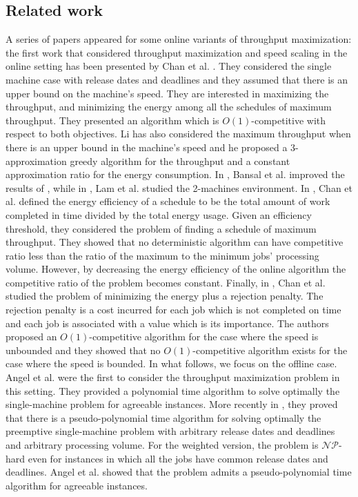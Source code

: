 \documentclass[11pt,a4paper]{article}
\begin{document}
\subsection{Related work}
A series of papers appeared for some online variants of throughput maximization: the first work that considered throughput maximization and speed scaling in the online setting  has been presented by Chan et al.
\cite{CCLLMW07}. They considered the single machine case with release dates and deadlines and they assumed that there is an upper bound on the machine's speed.
They are interested in maximizing the throughput, and minimizing the energy among
all the schedules of maximum throughput.
They presented an algorithm which is $O(1)$-competitive with respect to both objectives.
Li \cite{Li11} has also considered the maximum throughput when
there is an upper bound in the machine's speed and he proposed
a 3-approximation greedy algorithm for the throughput and a 
constant approximation ratio for the energy consumption.
In \cite{BCLL08}, Bansal et al. improved the results of \cite{CCLLMW07}, while in \cite{LLTW07}, Lam et al. studied the 2-machines
environment.
In \cite{CLMW07}, Chan et al.  defined the energy efficiency of a schedule 
to be the total amount of work completed in time divided by the total energy usage.
Given an efficiency threshold, they considered the problem of finding a schedule of maximum throughput.
They showed that no deterministic algorithm can have competitive ratio less than the ratio of the maximum to 
the minimum jobs' processing volume.
However, by decreasing the energy efficiency of the online algorithm the competitive ratio
of the problem becomes constant.
 Finally,
in \cite{CLL10}, Chan et al. studied the problem of minimizing the energy plus a rejection penalty. The rejection penalty is a cost incurred for each job which is not completed on time and each job is associated with a value which is its importance. The authors proposed an $O(1)$-competitive algorithm for the case where the speed is unbounded and they showed that no $O(1)$-competitive algorithm exists for the case where the speed is bounded.
In what follows, we focus on the offline case.
Angel et al. \cite{ABCL13} were the first to consider the
throughput maximization problem in this setting. 
They provided
a polynomial time algorithm to solve optimally the single-machine problem for agreeable instances. More recently in \cite{ABC14}, they proved that there is a pseudo-polynomial time algorithm for solving optimally the preemptive single-machine problem with arbitrary release dates and deadlines and arbitrary processing volume. For the weighted version, the problem is $\mathcal{NP}$-hard even for instances in which all the jobs have common release dates and deadlines. Angel et al. \cite{ABCL13} showed that the problem admits a pseudo-polynomial time algorithm for agreeable instances. 
\end{document}
